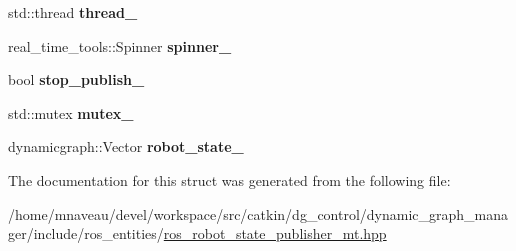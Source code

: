 \begin{DoxyCompactItemize}
\item 
std\+::thread {\bfseries thread\+\_\+}\hypertarget{structdynamic__graph_1_1RosRobotStatePublisherMtInternal_a5df491b287f390cfafcc173181981b25}{}\label{structdynamic__graph_1_1RosRobotStatePublisherMtInternal_a5df491b287f390cfafcc173181981b25}

\item 
real\+\_\+time\+\_\+tools\+::\+Spinner {\bfseries spinner\+\_\+}\hypertarget{structdynamic__graph_1_1RosRobotStatePublisherMtInternal_aa4aa01f9d16725c5e314384111ff563e}{}\label{structdynamic__graph_1_1RosRobotStatePublisherMtInternal_aa4aa01f9d16725c5e314384111ff563e}

\item 
bool {\bfseries stop\+\_\+publish\+\_\+}\hypertarget{structdynamic__graph_1_1RosRobotStatePublisherMtInternal_a8119b11fca598b99c4af814a10778c2c}{}\label{structdynamic__graph_1_1RosRobotStatePublisherMtInternal_a8119b11fca598b99c4af814a10778c2c}

\item 
std\+::mutex {\bfseries mutex\+\_\+}\hypertarget{structdynamic__graph_1_1RosRobotStatePublisherMtInternal_a3103d4fb6f8c909b61dd172424ad462d}{}\label{structdynamic__graph_1_1RosRobotStatePublisherMtInternal_a3103d4fb6f8c909b61dd172424ad462d}

\item 
dynamicgraph\+::\+Vector {\bfseries robot\+\_\+state\+\_\+}\hypertarget{structdynamic__graph_1_1RosRobotStatePublisherMtInternal_a50521c986af60cc19754eeba85f17345}{}\label{structdynamic__graph_1_1RosRobotStatePublisherMtInternal_a50521c986af60cc19754eeba85f17345}

\end{DoxyCompactItemize}


The documentation for this struct was generated from the following file\+:\begin{DoxyCompactItemize}
\item 
/home/mnaveau/devel/workspace/src/catkin/dg\+\_\+control/dynamic\+\_\+graph\+\_\+manager/include/ros\+\_\+entities/\hyperlink{ros__robot__state__publisher__mt_8hpp}{ros\+\_\+robot\+\_\+state\+\_\+publisher\+\_\+mt.\+hpp}\end{DoxyCompactItemize}
